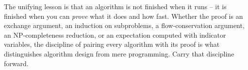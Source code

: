 \documentclass[11pt]{article}
\begin{document}
The unifying lesson is that an algorithm is not finished when it runs -- it is
finished when you can \emph{prove} what it does and how fast. Whether the proof is
an exchange argument, an induction on subproblems, a flow-conservation argument, an
NP-completeness reduction, or an expectation computed with indicator variables, the
discipline of pairing every algorithm with its proof is what distinguishes
algorithm design from mere programming. Carry that discipline forward.
\end{document}
